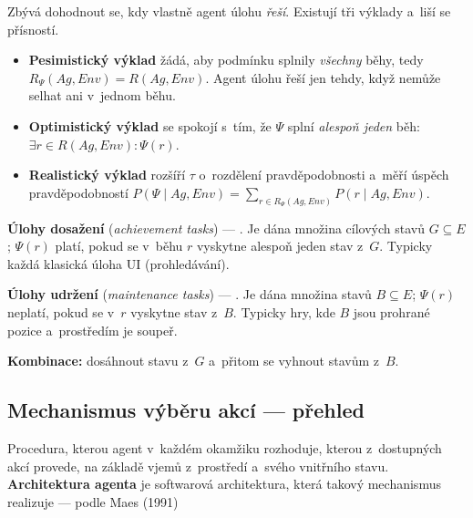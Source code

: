 \documentclass[11pt,a4paper]{article}
\theoremstyle{definition}
\begin{document}
Zbývá dohodnout se, kdy vlastně agent úlohu \emph{řeší}. Existují tři výklady a~liší se
přísností.
\begin{itemize}
\item \textbf{Pesimistický výklad} žádá, aby podmínku splnily \emph{všechny} běhy, tedy
  $R_\Psi(Ag,\mathit{Env}) = R(Ag,\mathit{Env})$. Agent úlohu řeší jen tehdy, když nemůže
  selhat ani v~jednom běhu.
\item \textbf{Optimistický výklad} se spokojí s~tím, že $\Psi$ splní \emph{alespoň jeden} běh:
  $\exists r \in R(Ag,\mathit{Env}): \Psi(r)$.
\item \textbf{Realistický výklad} rozšíří $\tau$ o~rozdělení pravděpodobnosti a~měří úspěch
  pravděpodobností
  $P(\Psi \mid Ag,\mathit{Env}) = \sum_{r \in R_\Psi(Ag,\mathit{Env})} P(r \mid Ag,\mathit{Env})$.
\end{itemize}

\begin{defbox}
\textbf{Úlohy dosažení} (\emph{achievement tasks}) --- . Je dána množina cílových
stavů $G \subseteq E$; $\Psi(r)$ platí, pokud se v~běhu $r$ vyskytne alespoň jeden stav z~$G$.
Typicky každá klasická úloha UI (prohledávání).

\textbf{Úlohy udržení} (\emph{maintenance tasks}) --- . Je dána množina
 stavů $B \subseteq E$; $\Psi(r)$ neplatí, pokud se v~$r$ vyskytne stav z~$B$.
Typicky hry, kde $B$ jsou prohrané pozice a~prostředím je soupeř.

\textbf{Kombinace:} dosáhnout stavu z~$G$ a~přitom se vyhnout stavům z~$B$.
\end{defbox}

\subsection{Mechanismus výběru akcí --- přehled}
\label{ssec:vyber-akci}

\begin{defbox}
Procedura, kterou agent v~každém okamžiku rozhoduje, kterou z~dostupných akcí provede,
na základě vjemů z~prostředí a~svého vnitřního stavu. \textbf{Architektura agenta} je
softwarová architektura, která takový mechanismus realizuje --- podle Maes (1991)
\end{defbox}
\end{document}
